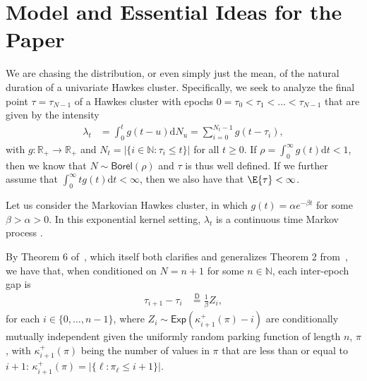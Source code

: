 \newpage

\begin{center}
\begin{large}
\end{large}
\end{center}

\section{Model and Essential Ideas for the Paper}


We are chasing the distribution, or even simply just the mean, of the natural duration of a univariate Hawkes cluster. Specifically, we seek to analyze the final point $\tau = \tau_{N-1}$ of a Hawkes cluster with epochs $0 = \tau_0 < \tau_1 < \dots < \tau_{N-1}$ that are given by the intensity
\begin{align}
\lambda_t
&=
\int_0^t g(t-u)\mathrm{d}N_u
=
\sum_{i=0}^{N_t-1}
g(t-\tau_i)
,
\end{align}
with $g:\mathbb{R}_+ \to \mathbb{R}_+$ and $N_t = |\{i \in \mathbb{N} : \tau_i \leq t\}|$ for all $t \geq 0$. If $\rho = \int_0^\infty g(t) \mathrm{d}t < 1$, then we know that $N \sim \mathsf{Borel}(\rho)$ and $\tau$ is thus well defined. If we further assume that $\int_0^\infty t g(t) \mathrm{d}t < \infty$, then we also have that $\E{\tau} < \infty$. 


Let us consider the Markovian Hawkes cluster, in which $g(t) = \alpha e^{-\beta t}$ for some $\beta > \alpha > 0$. In this exponential kernel setting, $\lambda_t$ is a continuous time Markov process \citep{oakes1975markovian}.

By Theorem 6 of~\citet{daw2026asymmetries}, which itself both clarifies and generalizes Theorem 2 from~\citet{daw2023conditional}, we have that, when conditioned on $N=n+1$ for some $n \in \mathbb{N}$,  each inter-epoch gap is 
\begin{align}
\tau_{i+1} - \tau_{i}
&\stackrel{\mathsf{D}}{=}
\frac{1}{\beta} Z_i
,
\label{heldexpId1}
\end{align}
for each $i \in \{0, \dots, n-1\}$, where $Z_i \sim \mathsf{Exp}\left(\kappa_{i+1}^+(\pi) - i\right)$ are conditionally mutually independent given the uniformly random parking function of length $n$, $\pi$, with $\kappa_{i+1}^+(\pi)$ being the number of values in $\pi$ that are less than or equal to $i+1$: $\kappa_{i+1}^+(\pi) = |\{\ell : \pi_\ell \leq i+1\}|$.



